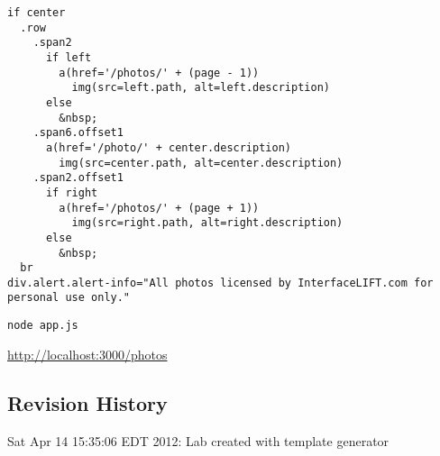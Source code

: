 \documentclass{article}
\begin{document}

\begin{verbatim}
if center
  .row
    .span2
      if left
        a(href='/photos/' + (page - 1))
          img(src=left.path, alt=left.description)
      else
        &nbsp;
    .span6.offset1
      a(href='/photo/' + center.description)
        img(src=center.path, alt=center.description)
    .span2.offset1
      if right
        a(href='/photos/' + (page + 1))
          img(src=right.path, alt=right.description)
      else
        &nbsp;
  br
div.alert.alert-info="All photos licensed by InterfaceLIFT.com for personal use only."
\end{verbatim}

\verb!node app.js!

\href{http://localhost:3000/photos}{http://localhost:3000/photos}



\subsection*{Revision History}
\begin{itemize*}
 \item Sat Apr 14 15:35:06 EDT 2012: Lab created with template generator
\end{itemize*}
\end{document}
